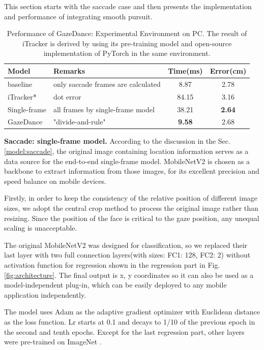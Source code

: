 \documentclass[acmlarge]{acmart}
\begin{document}
This section starts with the saccade case and then presents the implementation and performance of integrating smooth pursuit.

\begin{table}
  \caption{Performance of GazeDance: Experimental Environment on PC. The result of iTracker \cite{krafka2016eye} is derived by using its pre-training model and open-source implementation of PyTorch in the same environment. }
  \label{tab:gazedance}
  \begin{tabular}{llcc}
    \toprule
    Model & Remarks & Time(ms) & Error(cm) \\
    \midrule
    baseline & only saccade frames are calculated & 8.87 & 2.78 \\
    iTracker* & dot error & 84.15 & 3.16\\
    Single-frame & all frames by single-frame model & 38.21 &\textbf{ 2.64} \\
    GazeDance & "divide-and-rule" & \textbf{9.58} & 2.68 \\
  \bottomrule
\end{tabular}
\end{table}

\textbf{Saccade: single-frame model.} \label{subsec:backbone}
According to the discussion in the Sec. \ref{model:saccade}, the original image containing location information serves as a data source for the end-to-end single-frame model. MobileNetV2 is chosen as a backbone to extract information from those images, for its excellent precision and speed balance on mobile devices.

Firstly, in order to keep the consistency of the relative position of different image sizes, we adopt the central crop method to process the original image rather than resizing. Since the position of the face is critical to the gaze position, any unequal scaling is unacceptable. 

The original MobileNetV2 was designed for classification, so we replaced their last layer with two full connection layers(with sizes: FC1: 128, FC2: 2) without activation function for regression shown in the regression part in Fig. \ref{fig:architecture}. The final output is x, y coordinates so it can also be used as a model-independent plug-in, which can be easily deployed to any mobile application independently.

The model uses Adam \cite{kingma2014adam} as the adaptive gradient optimizer with Euclidean distance as the loss function. Lr starts at 0.1 and decays to 1/10 of the previous epoch in the second and tenth epochs. Except for the last regression part, other layers were pre-trained on ImageNet \cite{deng2009imagenet}.
\end{document}
